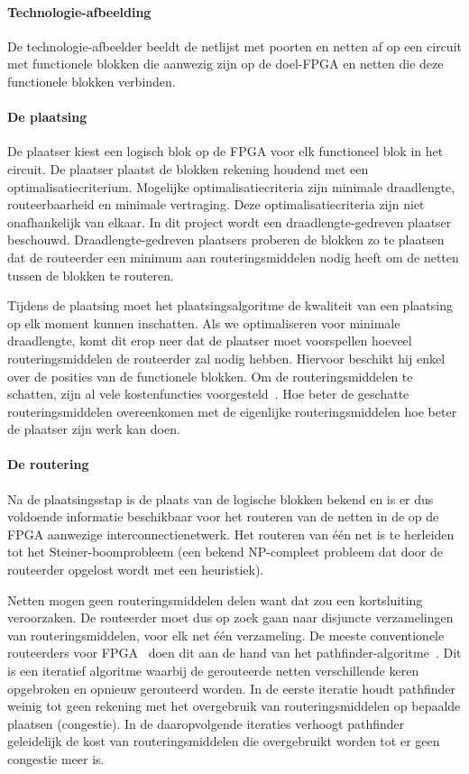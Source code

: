 \documentclass[a4paper,oneside,12pt]{article}
\begin{document}
\paragraph{Technologie-afbeelding} 
De technologie-afbeelder beeldt de netlijst met poorten en netten af op een circuit met functionele blokken die aanwezig zijn op de doel-FPGA en netten die deze functionele blokken verbinden.

\paragraph{De plaatsing}
De plaatser kiest een logisch blok op de FPGA voor elk functioneel blok in het circuit. De plaatser plaatst de blokken rekening houdend met een optimalisatiecriterium. Mogelijke optimalisatiecriteria zijn minimale draadlengte, routeerbaarheid en minimale vertraging. Deze optimalisatiecriteria zijn niet onafhankelijk van elkaar. In dit project wordt een draadlengte-gedreven plaatser beschouwd. Draadlengte-gedreven plaatsers proberen de blokken zo te plaatsen dat de routeerder een minimum aan routeringsmiddelen nodig heeft om de netten tussen de blokken te routeren.

Tijdens de plaatsing moet het plaatsingsalgoritme de kwaliteit van een plaatsing op elk moment kunnen inschatten. Als we optimaliseren voor minimale draadlengte, komt dit erop neer dat de plaatser moet voorspellen hoeveel routeringsmiddelen de routeerder zal nodig hebben. Hiervoor beschikt hij enkel over de posities van de functionele blokken. Om de routeringsmiddelen te schatten, zijn al vele kostenfuncties voorgesteld~\cite{vprBVRJ, vprboek}. Hoe beter de geschatte routeringsmiddelen overeenkomen met de eigenlijke routeringsmiddelen hoe beter de plaatser zijn werk kan doen.

\paragraph{De routering} Na de plaatsingsstap is de plaats van de logische blokken bekend en is er dus voldoende informatie beschikbaar voor het routeren van de netten in de op de FPGA aanwezige interconnectienetwerk. Het routeren van \'e\'en net is te herleiden tot het Steiner-boomprobleem (een bekend NP-compleet probleem dat door de routeerder opgelost wordt met een heuristiek).

Netten mogen geen routeringsmiddelen delen want dat zou een kortsluiting veroorzaken. De routeerder moet dus op zoek gaan naar disjuncte verzamelingen van routeringsmiddelen, voor elk net \'e\'en verzameling. De meeste conventionele routeerders voor FPGA~\cite{vprBVRJ, vprboek} doen dit aan de hand van het pathfinder-algoritme~\cite{pathfinder}. Dit is een iteratief algoritme waarbij de gerouteerde netten verschillende keren opgebroken en opnieuw gerouteerd worden. In de eerste iteratie houdt pathfinder weinig tot geen rekening met het overgebruik van routeringsmiddelen op bepaalde plaatsen (congestie). In de daaropvolgende iteraties verhoogt pathfinder geleidelijk de kost van routeringsmiddelen die overgebruikt worden tot er geen congestie meer is.
\end{document}
